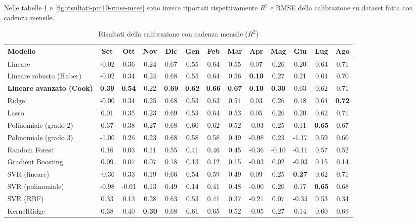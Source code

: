 Nelle tabelle \ref{fig:risultati-pm10-mese} e \ref{fig:risultati-pm10-rmse-mese} sono invece riportati rispettivamente $R^2$ e RMSE della calibrazione su dataset  fatta con cadenza mensile.

\begin{table}[H]
    \tiny
    \centering
    \setlength{\tabcolsep}{4pt}
    \def\arraystretch{1.5}
    \begin{tabular}{|l|c|c|c|c|c|c|c|c|c|c|c|c|}
    \hline
        \textbf{Modello} & \textbf{Set} & \textbf{Ott} & \textbf{Nov} & \textbf{Dic} & \textbf{Gen} & \textbf{Feb} & \textbf{Mar} & \textbf{Apr} & \textbf{Mag} & \textbf{Giu} & \textbf{Lug} & \textbf{Ago} \\ \hline
        Lineare & -0.02 & 0.36 & 0.24 & 0.67 & 0.55 & 0.64 & 0.55 & 0.07 & 0.26 & 0.20 & 0.64 & 0.71 \\ \hline
        Lineare robusto (Huber) & -0.02 & 0.34 & 0.24 & 0.68 & 0.55 & 0.64 & 0.56 & \textbf{0.10} & 0.27 & 0.21 & 0.64 & 0.70 \\ \hline
        \textbf{Lineare avanzato (Cook)} & \textbf{0.39} & \textbf{0.54} & 0.22 & \textbf{0.69} & \textbf{0.62} & \textbf{0.66} & \textbf{0.67} & \textbf{0.10} & \textbf{0.30} & 0.03 & 0.62 & 0.71 \\ \hline
        Ridge & -0.00 & 0.34 & 0.25 & 0.68 & 0.53 & 0.63 & 0.54 & 0.03 & 0.26 & 0.18 & 0.64 & \textbf{0.72} \\ \hline
        Lasso & 0.01 & 0.35 & 0.23 & 0.69 & 0.53 & 0.64 & 0.53 & 0.05 & 0.26 & 0.20 & 0.62 & 0.71 \\ \hline
        Polinomiale (grado 2) & 0.37 & 0.38 & 0.27 & 0.68 & 0.60 & 0.62 & 0.52 & -0.03 & 0.25 & 0.11 & \textbf{0.65} & 0.67 \\ \hline
        Polinomiale (grado 3) & -1.00 & 0.26 & 0.23 & 0.68 & 0.58 & 0.58 & 0.49 & -0.08 & 0.23 & -1.17 & 0.59 & 0.60 \\ \hline
        Random Forest & 0.16 & 0.03 & 0.11 & 0.55 & 0.41 & 0.46 & 0.45 & -0.36 & -0.10 & -0.11 & 0.57 & 0.52 \\ \hline
        Gradient Boosting & 0.09 & 0.07 & 0.07 & 0.18 & 0.13 & 0.12 & 0.15 & -0.03 & 0.02 & -0.03 & 0.15 & 0.14 \\ \hline
        SVR (lineare) & -0.36 & 0.33 & 0.19 & 0.66 & 0.54 & 0.59 & 0.49 & 0.09 & 0.25 & \textbf{0.27} & 0.62 & 0.71 \\ \hline
        SVR (polinomiale) & -0.98 & -0.01 & 0.13 & 0.49 & 0.14 & 0.41 & 0.48 & -0.00 & 0.20 & 0.17 & \textbf{0.65} & 0.68 \\ \hline
        SVR (RBF) & 0.33 & 0.13 & 0.28 & 0.63 & 0.53 & 0.41 & 0.37 & -0.21 & 0.07 & -0.35 & 0.53 & 0.34 \\ \hline
        KernelRidge & 0.38 & 0.40 & \textbf{0.30} & 0.68 & 0.61 & 0.65 & 0.52 & -0.05 & 0.27 & 0.14 & 0.60 & 0.69 \\ \hline
    \end{tabular}
    \captionsetup{justification=centering}
    \caption{Risultati della calibrazione  con cadenza mensile ($R^2$)}
    \label{fig:risultati-pm10-mese}
\end{table}

